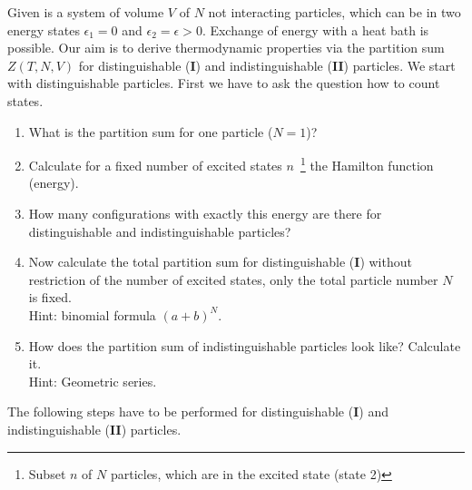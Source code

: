 \documentclass[12pt,a4paper]{article} %
\begin{document}
Given is a system of volume $V$ of $N$ not interacting particles, which can be in two energy states $\epsilon_1 = 0$ and $\epsilon_2 = \epsilon > 0$. Exchange of energy with a heat bath is possible.
Our aim is to derive thermodynamic properties via the partition sum $Z(T,N,V)$ for distinguishable (\textbf{I}) and indistinguishable (\textbf{II}) particles. We start with distinguishable particles. First we have to ask the question how to count states. 
\begin{enumerate}

 \item What is the partition sum for one particle ($N = 1$)?
 \item Calculate for a fixed number of excited states $n$~\footnote{Subset $n$ of $N$ particles, which are in the excited state (state 2)} the Hamilton function (energy). 
 \item How many configurations with exactly this energy are there for distinguishable and indistinguishable particles?
 
 \item Now calculate the total partition sum for distinguishable (\textbf{I}) without restriction of the number of excited states, only the total particle number $N$ is fixed. \\Hint: binomial formula $(a+b)^N$.
 \item How does the partition sum of indistinguishable particles look like? Calculate it. \\Hint: Geometric series. 
 \end{enumerate}
 The following steps have to be performed for distinguishable (\textbf{I}) and indistinguishable (\textbf{II}) particles.
\end{document}

